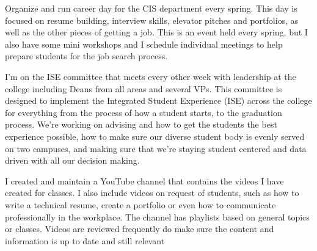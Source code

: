{
{Organize and run career day for the CIS department every spring.  This day is focused on resume building, interview skills, elevator pitches and portfolios, as well as the other pieces of getting a job.  This is an event held every spring, but I also have some mini workshops and I schedule individual meetings to help prepare students for the job search process.}

{I'm on the ISE committee that meets every other week with leadership at the college including Deans from all areas and several VPs.  This committee is designed to implement the Integrated Student Experience (ISE) across the college for everything from the process of how a student starts, to the graduation process.  We’re working on advising and how to get the students the best experience possible, how to make sure our diverse student body is evenly served on two campuses, and making sure that we’re staying student centered and data driven with all our decision making.}


{I created and maintain a YouTube channel that contains the videos I have created for classes.  I also include videos on request of students, such as how to write a technical resume, create a portfolio or even how to communicate professionally in the workplace.  The channel has playlists based on general topics or classes.  Videos are reviewed frequently do make sure the content and information is up to date and still relevant}


}
